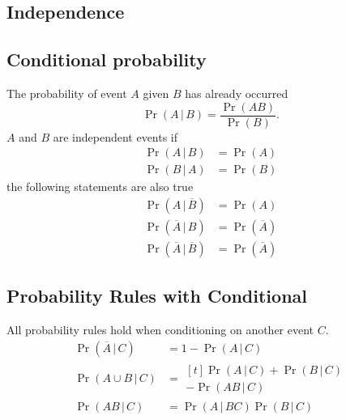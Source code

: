 \documentclass{article}
\begin{document}
\begin{multicols}{3}
    \section{Independence}
    \subsection{Conditional probability}
    The probability of event \(A\) given \(B\) has already occurred
    \begin{equation*}
        \Pr{\left( A \,\vert\, B \right)} = \frac{\Pr{\left( A B \right)}}{\Pr{\left( B \right)}}.
    \end{equation*}
    \(A\) and \(B\) are independent events if
    \begin{align*}
        \Pr{\left( A \,\vert\, B \right)} & = \Pr{\left( A \right)} \\
        \Pr{\left( B \,\vert\, A \right)} & = \Pr{\left( B \right)}
    \end{align*}
    the following statements are also true
    \begin{align*}
        \Pr{\left( A \,\vert\, \overline{B} \right)}            & = \Pr{\left( A \right)}            \\
        \Pr{\left( \overline{A} \,\vert\, B \right)}            & = \Pr{\left( \overline{A} \right)} \\
        \Pr{\left( \overline{A} \,\vert\, \overline{B} \right)} & = \Pr{\left( \overline{A} \right)}
    \end{align*}
    \subsection{Probability Rules with Conditional}
    All probability rules hold when conditioning on another event \(C\).
    \begin{align*}
        \Pr{\left( \overline{A} \,\vert\, C \right)} & = 1 - \Pr{\left( A \,\vert\, C \right)}                                 \\
        \Pr{\left( A \cup B \,\vert\, C \right)}     & = \begin{aligned}[t]
                                                             \Pr{\left( A \,\vert\, C \right)} + \Pr{\left( B \,\vert\, C \right)} \\
                                                             - \Pr{\left( AB \,\vert\, C \right)}
                                                         \end{aligned} \\
        \Pr{\left( A B \,\vert\, C \right)}          & = \Pr{\left( A \,\vert\, BC \right)} \Pr{\left( B \,\vert\, C \right)}
    \end{align*}

\end{multicols}
\end{document}
